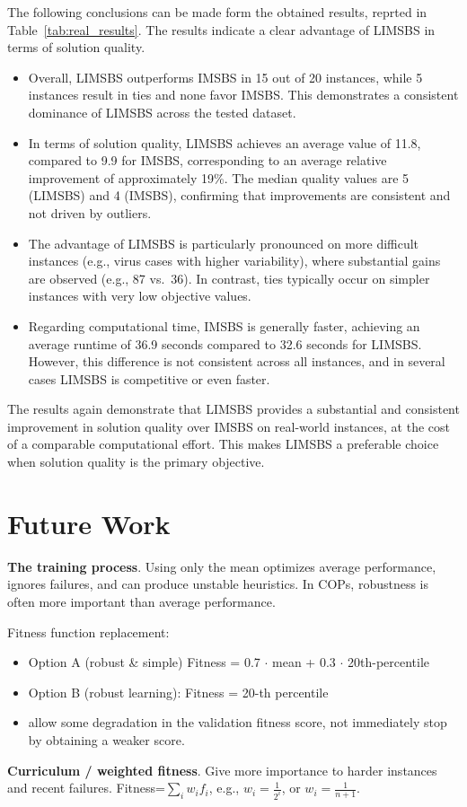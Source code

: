 \documentclass[11pt,a4paper]{article}
\begin{document}
 The following conclusions can be made form the obtained results, reprted in
 Table~\ref{tab:real_results}. The results indicate a clear advantage of LIMSBS in terms of solution quality. 
 \begin{itemize}
 	\item  Overall, LIMSBS outperforms IMSBS in 15 out of 20 instances, while 5 instances result in ties and none favor IMSBS. This demonstrates a consistent dominance of LIMSBS across the tested dataset.
 
    \item In terms of solution quality, LIMSBS achieves an average value of 11.8, compared to 9.9 for IMSBS, corresponding to an average relative improvement of approximately 19\%. The median quality values are 5 (LIMSBS) and 4 (IMSBS), confirming that improvements are consistent and not driven by outliers.
 
   \item The advantage of LIMSBS is particularly pronounced on more difficult instances (e.g., virus cases with higher variability), where substantial gains are observed (e.g., 87 vs.\ 36). In contrast, ties typically occur on simpler instances with very low objective values.
 
   \item Regarding computational time, IMSBS is generally faster, achieving an average runtime of 36.9 seconds compared to 32.6 seconds for LIMSBS. However, this difference is not consistent across all instances, and in several cases LIMSBS is competitive or even faster.
  \end{itemize}
  The results again demonstrate that LIMSBS provides a substantial and consistent improvement in solution quality over IMSBS on real-world instances, at the cost of a comparable computational effort. This makes LIMSBS a preferable choice when solution quality is the primary objective.
  
  \section{Future Work}  
  
  \textbf{The training process}. Using only the mean optimizes average performance, ignores failures, and can produce unstable heuristics.  In COPs, robustness is often more important than average performance.
  
  Fitness function replacement:
  \begin{itemize}
  	\item  Option A (robust \& simple)   Fitness = 0.7 $\cdot$ mean + 0.3 $\cdot$ 20th-percentile
  	\item Option B (robust learning):    Fitness = 20-th percentile 
  	\item allow some degradation in the validation fitness score, not immediately stop by obtaining a weaker score.  
  \end{itemize}
  
  \textbf{ Curriculum / weighted fitness}.   Give more importance to harder instances and recent failures. 
  Fitness=$\sum_i w_i f_i$, e.g., $w_i = \frac{1}{2^i}$, or $w_i=\frac{1}{n+1}$. 
  
  
  
 
\end{document}
